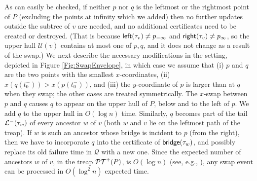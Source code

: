 \documentclass[11pt]{article}
\def\bridge{{\sf bridge}}
\def\U{{\mathcal U}}
\def\PT{{\cal PT}}
\def\U{\mathcal{U}}
\def\Q{\mathcal{Q}}
\def\L{{\cal L}}
\def\Left{{\sf left}}
\def\Right{{\sf right}}
\begin{document}
 As can easily be checked, if neither $p$ nor $q$ is
the leftmost or the rightmost point of $P$ (excluding the points
at infinity which we added)
 then no further updates outside the
 subtree of $v$ are needed, and no additional certificates need to be
 created or destroyed. (That is because $\Left(\tau_v)\neq p_{-\infty}$ and $\Right(\tau_v)\neq p_{\infty}$, so the upper hull $\U(v)$ contains at most one of $p,q$, and it does not change as a result of the swap.)
 We next describe the necessary modifications in the setting, depicted in Figure \ref{Fig:SwapEnvelope}, in which case we
 assume that (i) $p$ and $q$ are the two points with the smallest
 $x$-coordinates, (ii) $x(q(t_0^-))>x(p(t_0^-))$, and (iii)
the $y$-coordinate of
 $p$ is larger than at $q$
when they swap; the other cases are treated
 symmetrically.  The $x$-swap between $p$ and $q$ causes $q$ to appear
 on the upper hull of $P$, below and to the left of $p$.
We add $q$ to the upper hull in  $O(\log n)$
 time. Similarly, $q$ becomes part of the tail $\L^-(\tau_w)$ of every
 ancestor $w$ of $v$ (both $w$ and $v$ lie on the leftmost path of the treap). If $w$ is such an ancestor whose bridge is incident to $p$ (from the right), then we have to incorporate $q$ into the certificate of
 $\bridge(\tau_w)$, and possibly replace its old failure time in
 $\Q$ with a new one. Since the expected number of ancestors $w$ of
 $v$, in the treap $\PT^+(P)$, is $O(\log n)$ (see, e.g., \cite{SA96}), any swap event can
 be processed in $O(\log^2n)$ expected time.
\end{document}
